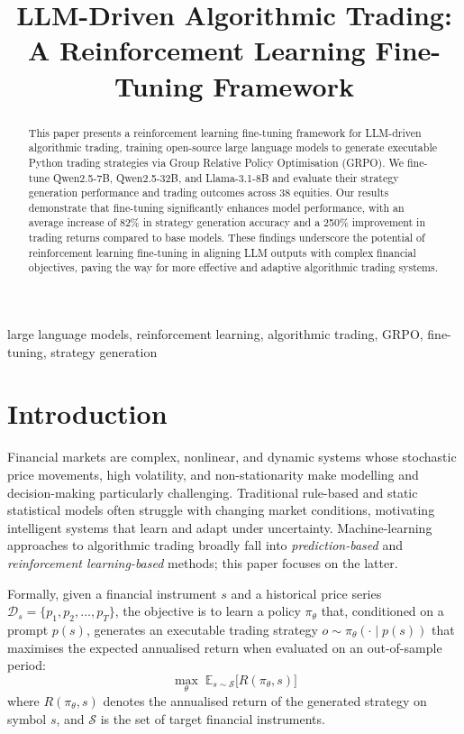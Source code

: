 \documentclass[conference,a4paper]{IEEEtran}
\title{LLM-Driven Algorithmic Trading: A Reinforcement Learning Fine-Tuning Framework}
\author{
  \IEEEauthorblockN{Anonymous Authors}
  \IEEEauthorblockA{Details omitted for double-blind review}
}
\begin{document}
\maketitle

\begin{abstract}
This paper presents a reinforcement learning fine-tuning framework for LLM-driven algorithmic
trading, training open-source large language models to generate executable Python trading
strategies via Group Relative Policy Optimisation (GRPO).
We fine-tune Qwen2.5-7B, Qwen2.5-32B, and Llama-3.1-8B and evaluate their strategy generation
performance and trading outcomes across 38 equities.
Our results demonstrate that fine-tuning significantly enhances model performance,
with an average increase of 82\% in strategy generation accuracy and a 250\% improvement in trading returns compared to base models.
These findings underscore the potential of reinforcement learning fine-tuning in aligning LLM outputs with complex financial objectives,
paving the way for more effective and adaptive algorithmic trading systems.
\end{abstract}

\begin{IEEEkeywords}
large language models, reinforcement learning, algorithmic trading, GRPO, fine-tuning, strategy generation
\end{IEEEkeywords}

\section{Introduction}
\label{ch:intro}

Financial markets are complex, nonlinear, and dynamic systems whose stochastic price
movements, high volatility, and non-stationarity make modelling and decision-making
particularly challenging. Traditional rule-based and static statistical models often
struggle with changing market conditions, motivating intelligent systems that learn and
adapt under uncertainty. Machine-learning approaches to algorithmic trading broadly fall
into \emph{prediction-based} and \emph{reinforcement learning-based} methods; this paper
focuses on the latter.

Formally, given a financial instrument $s$ and a historical price series
$\mathcal{D}_s = \{p_1, p_2, \ldots, p_T\}$, the objective is to learn a policy $\pi_\theta$ that,
conditioned on a prompt $p(s)$, generates an executable trading strategy
$o \sim \pi_\theta(\cdot \mid p(s))$ that maximises the expected annualised return when evaluated
on an out-of-sample period:
\begin{equation}
  \max_\theta \; \mathbb{E}_{s \sim \mathcal{S}}\bigl[R(\pi_\theta, s)\bigr]
\end{equation}
where $R(\pi_\theta, s)$ denotes the annualised return of the generated strategy on symbol $s$, and
$\mathcal{S}$ is the set of target financial instruments.
\end{document}
